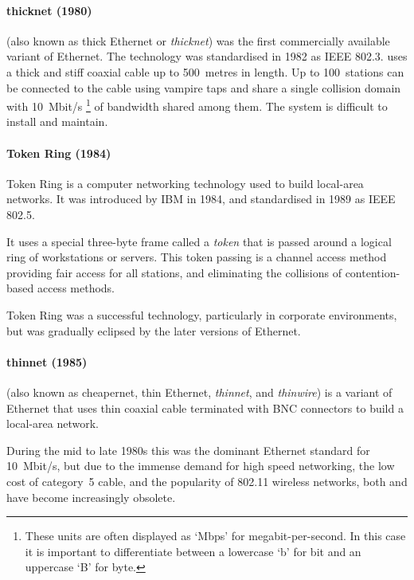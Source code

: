 \paragraph{thicknet (1980)}%
 (also known as thick Ethernet or \emph{thicknet}) was the first commercially available variant of Ethernet.
The technology was standardised in 1982 as \acs{IEEE} 802.3.
 uses a thick and stiff coaxial cable up to 500~metres in length.
Up to 100~stations can be connected to the cable using vampire taps and share a single collision domain with 10~Mbit/s%
   \footnote{These units are often displayed as `Mbps' for megabit-per-second. In this case it is important to differentiate between a lowercase `b' for bit and an uppercase `B' for byte.}
of bandwidth shared among them.
The system is difficult to install and maintain.

\paragraph{Token Ring (1984)}%
Token Ring is a computer networking technology used to build local-area networks.
It was introduced by IBM in 1984, and standardised in 1989 as \acs{IEEE} 802.5.

It uses a special three-byte frame called a \emph{token} that is passed around a logical ring of workstations or servers.
This token passing is a channel access method providing fair access for all stations, and eliminating the collisions of contention-based access methods.

Token Ring was a successful technology, particularly in corporate environments, but was gradually eclipsed by the later versions of Ethernet.

\paragraph{thinnet (1985)}%
 (also known as cheapernet, thin Ethernet, \emph{thinnet}, and \emph{thinwire}) is a variant of Ethernet that uses thin coaxial cable terminated with \acs{BNC} connectors to build a local-area network.

During the mid to late 1980s this was the dominant Ethernet standard for 10~Mbit/s, %
but due to the immense demand for high speed networking, the low cost of category~5 cable, and the popularity of 802.11 wireless networks, both  and  have become increasingly obsolete.

